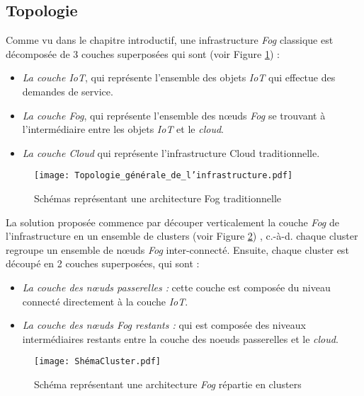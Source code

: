 \subsection{Topologie}
Comme vu dans le chapitre introductif, une infrastructure \emph{Fog} classique est décomposée de 3 couches superposées qui sont (voir Figure \ref{fig:Topologie_generale_de_linfrastructure}) :
\begin{itemize}
    \item \emph{La couche IoT}, qui représente l'ensemble des objets \emph{IoT} qui effectue des demandes de service.
    \item \emph{La couche Fog}, qui représente l'ensemble des nœuds \emph{Fog} se trouvant à l'intermédiaire entre les objets \emph{IoT} et le \emph{cloud}.
    \item \emph{La couche Cloud} qui représente l'infrastructure Cloud traditionnelle.
\end{itemize}
\begin{figure}[H]
    \centering
    \texttt{[image: Topologie\_générale\_de\_l'infrastructure.pdf]}
    \caption{Schémas représentant une architecture Fog traditionnelle}
    \label{fig:Topologie_generale_de_linfrastructure}
\end{figure}
La solution proposée commence par découper verticalement la couche \emph{Fog} de l'infrastructure en un ensemble de clusters (voir Figure \ref{fig:Infrastructure_fog_repartie_en_cluster}) , c.-à-d. chaque cluster regroupe un ensemble de nœuds \emph{Fog} inter-connecté. Ensuite, chaque cluster est découpé en 2 couches superposées, qui sont :
\begin{itemize}
    \item \emph{La couche des nœuds passerelles :}  cette couche est composée du niveau connecté directement à la couche \emph{IoT}.
    \item \emph{La couche des nœuds Fog restants :} qui est composée des niveaux intermédiaires restants entre la couche des noeuds passerelles et le \emph{cloud}.
\end{itemize}
\begin{figure}[H]
    \centering
    \texttt{[image: ShémaCluster.pdf]}
    \caption{Schéma représentant une architecture \emph{Fog} répartie en clusters}
    \label{fig:Infrastructure_fog_repartie_en_cluster}
\end{figure}

